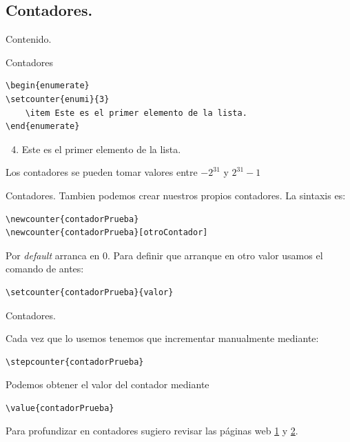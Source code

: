 \documentclass[dvipsnames,xcolor, handout]{beamer}
\theoremstyle{plain}
\theoremstyle{definition}
\begin{document}
\subsection{Contadores.}
\begin{frame}{Contenido.}
  \tableofcontents[currentsubsection]
\end{frame}
\begin{frame}[fragile]{Contadores}
\begin{verbatim}
\begin{enumerate}
\setcounter{enumi}{3}
    \item Este es el primer elemento de la lista.
\end{enumerate}    
\end{verbatim}
    \begin{enumerate}
    \setcounter{enumi}{3}
        \item Este es el primer elemento de la lista.
    \end{enumerate}
Los contadores se pueden tomar valores entre $-2^{31}$ y $2^{31}-1$
\end{frame}

\begin{frame}[fragile]{Contadores.}
Tambien podemos crear nuestros propios contadores. La sintaxis es:
\begin{small}
\begin{verbatim}
\newcounter{contadorPrueba}
\newcounter{contadorPrueba}[otroContador]
\end{verbatim}
\end{small}
Por \textit{default} arranca en 0. Para definir que arranque en otro valor usamos el comando de antes:
\begin{small}
\begin{verbatim}
\setcounter{contadorPrueba}{valor}
\end{verbatim}
\end{small}

\end{frame}

\begin{frame}[fragile]{Contadores.}

Cada vez que lo usemos tenemos que incrementar manualmente mediante:
\begin{small}
\begin{verbatim}
\stepcounter{contadorPrueba}
\end{verbatim}
\end{small}

Podemos obtener el valor del contador mediante 
\begin{small}
\begin{verbatim}
\value{contadorPrueba}
\end{verbatim}
\end{small}

Para profundizar en contadores sugiero revisar las páginas web \href{https://en.wikibooks.org/wiki/LaTeX/Counters}{\textcolor{colorClase}{1}} y \href{https://www.overleaf.com/learn/latex/Counters}{\textcolor{colorClase}{2}}.
\end{frame}
\end{document}
